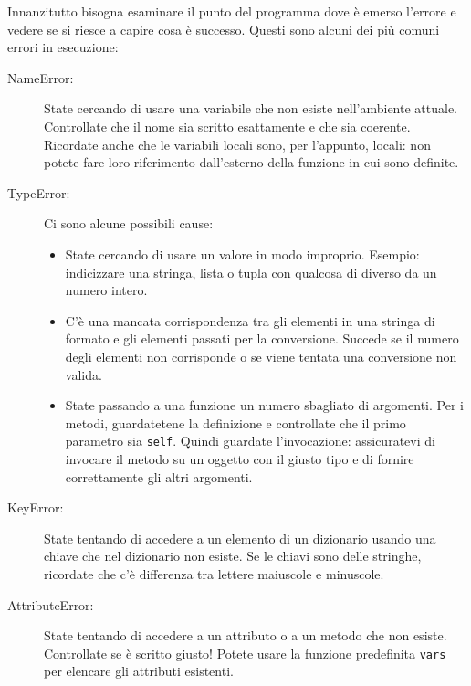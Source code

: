 \documentclass[10pt]{book}
\begin{document}
Innanzitutto bisogna esaminare il punto del programma dove è emerso l'errore e vedere se si riesce a capire cosa è successo. Questi sono alcuni dei più comuni errori in esecuzione:

\begin{description}

\item[NameError:]  State cercando di usare una variabile che non esiste nell'ambiente attuale. Controllate che il nome sia scritto esattamente e che sia coerente. Ricordate anche che le variabili locali sono, per l'appunto, locali: non potete fare loro riferimento dall'esterno della funzione in cui sono definite.

\item[TypeError:] Ci sono alcune possibili cause:

\begin{itemize}

\item  State cercando di usare un valore in modo improprio. Esempio: indicizzare una stringa, lista o tupla con qualcosa di diverso da un numero intero. 

\item C'è una mancata corrispondenza tra gli elementi in una stringa di formato e gli elementi passati per la conversione. Succede se il numero degli elementi non corrisponde o se viene tentata una conversione non valida.

\item State passando a una funzione un numero sbagliato di argomenti. Per i metodi, guardatetene la definizione e controllate che il primo parametro sia {\tt self}.  Quindi guardate l'invocazione: assicuratevi di invocare il metodo su un oggetto con il giusto tipo e di fornire correttamente gli altri argomenti.

\end{itemize}

\item[KeyError:]  State tentando di accedere a un elemento di un dizionario usando una chiave che nel dizionario non esiste. Se le chiavi sono delle stringhe, ricordate che c'è differenza tra lettere maiuscole e minuscole.

\item[AttributeError:] State tentando di accedere a un attributo o a un metodo che non esiste. Controllate se è scritto giusto! Potete usare la funzione predefinita {\tt vars} per elencare gli attributi esistenti.


\end{description}
\end{document}
